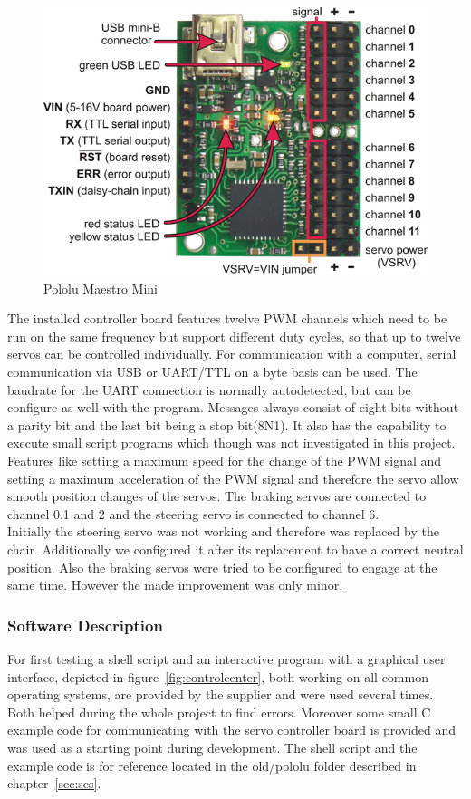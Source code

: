 \begin{figure}[h!tb]
	\centering
    \includegraphics[width=0.7\linewidth]{images/pololu}
    \caption{Pololu Maestro Mini}
    \label{fig:pololu}
\end{figure}

The installed controller board features twelve PWM channels which need to be run on the same frequency but support different duty cycles, so that up to twelve servos can be controlled individually. For communication with a computer, serial communication via USB or UART/TTL on a byte basis can be used. The baudrate for the UART connection is normally autodetected, but can be configure as well with the program. Messages always consist of eight bits without a parity bit and the last bit being a stop bit(8N1). It also has the capability to execute small script programs which though was not investigated in this project. Features like setting a maximum speed for the change of the PWM signal and setting a maximum acceleration of the PWM signal and therefore the servo allow smooth position changes of the servos. The braking servos are connected to channel 0,1 and 2 and the steering servo is connected to channel 6.\\

Initially the steering servo was not working and therefore was replaced by the chair. Additionally we configured it after its replacement to have a correct neutral position. Also the braking servos were tried to be configured to engage at the same time. However the made improvement was only minor.

\subsubsection{Software Description}
\label{sec:servo-soft}
For first testing a shell script and an interactive program with a graphical user interface, depicted in figure~\ref{fig:controlcenter}, both working on all common operating systems, are provided by the supplier and were used several times. Both helped during the whole project to find errors. Moreover some small C example code for communicating with the servo controller board is provided and was used as a starting point during development. The shell script and the example code is for reference located in the old/pololu folder described in chapter~\ref{sec:scs}.\\

